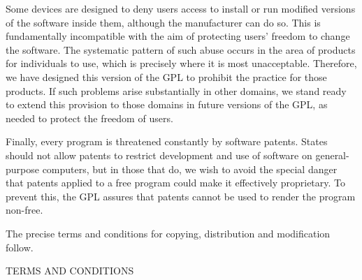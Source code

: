 \documentclass[11pt]{article}
\newcounter{v2section}
\newcounter{v3section}
\begin{document}
  Some devices are designed to deny users access to install or run
modified versions of the software inside them, although the manufacturer
can do so.  This is fundamentally incompatible with the aim of
protecting users' freedom to change the software.  The systematic
pattern of such abuse occurs in the area of products for individuals to
use, which is precisely where it is most unacceptable.  Therefore, we
have designed this version of the GPL to prohibit the practice for those
products.  If such problems arise substantially in other domains, we
stand ready to extend this provision to those domains in future versions
of the GPL, as needed to protect the freedom of users.

  Finally, every program is threatened constantly by software patents.
States should not allow patents to restrict development and use of
software on general-purpose computers, but in those that do, we wish to
avoid the special danger that patents applied to a free program could
make it effectively proprietary.  To prevent this, the GPL assures that
patents cannot be used to render the program non-free.

  The precise terms and conditions for copying, distribution and
modification follow.

\vspace{.2in}

\centerline{TERMS AND CONDITIONS}


\setcounter{secnumdepth}{2}
\addtocounter{section}{-1}
\setcounter{v2section}{0}

\newcommand\bracketsec[1]{\stepcounter{v2section}
 \renewcommand{\thesection}{\arabic{section}.\sout{[\arabic{v2section}]}}
 \section{#1}}

\newcommand\ordsec[1]{\renewcommand{\thesection}{\arabic{section}.}
 \section{#1}}

\newcommand\delsec[3]{\stepcounter{v2section}
 \renewcommand{\thesection}{\sout{{#1}\arabic{section}.[\arabic{v2section}]}}
 \section{\sout{#2}#3}
 }
\end{document}
